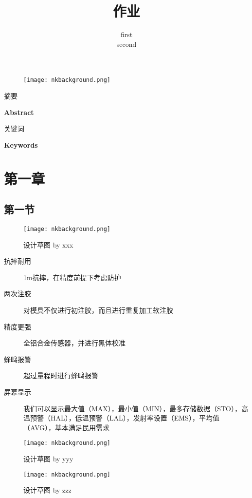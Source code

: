 \documentclass[hyperref,UTF8,12px,a4paper]{ctexart} %
\title{作业}
\author{first\\
second}
\numberwithin{equation}{section} %
\begin{document}
\maketitle
\begin{figure}[!htb]
	\centering
	\texttt{[image: nkbackground.png]}
\end{figure}
\thispagestyle{fancy} %

{\noindent \Large \heiti 摘要}\\
\par
{\noindent \Large \textbf{Abstract}}\\
\par
{\noindent \Large \heiti 关键词}\\
\par
{\noindent \Large \textbf{Keywords}}\\
\section{第一章}
\subsection{第一节}
\newpage
\begin{figure}[!htb]
	\centering
    \texttt{[image: nkbackground.png]}
    \caption{设计草图 by xxx}
\end{figure}

\begin{description}
    \item[抗摔耐用] 1m抗摔，在精度前提下考虑防护
    \item[两次注胶] 对模具不仅进行初注胶，而且进行重复加工软注胶
    \item[精度更强] 全铝合金传感器，并进行黑体校准
    \item[蜂鸣报警] 超过量程时进行蜂鸣报警
    \item[屏幕显示] 我们可以显示最大值（MAX），最小值（MIN），最多存储数据（STO），高温预警（HAL），低温预警（LAL），发射率设置（EMS），平均值（AVG），基本满足民用需求
\end{description}

\newpage
\begin{figure}[!htb]
	\centering
    \texttt{[image: nkbackground.png]}
    \caption{设计草图 by yyy}
\end{figure}

\newpage
\begin{figure}[!htb]
	\centering
    \texttt{[image: nkbackground.png]}
    \caption{设计草图 by zzz}
\end{figure}

\begin{comment}
\begin{itemize}
    \item 加入激光指示，远距离自动放大激光点大小
    \item 握柄采用流线型设计
    \item 过一段时间后可以自动关机
\end{itemize}
\end{comment}
\end{document}
